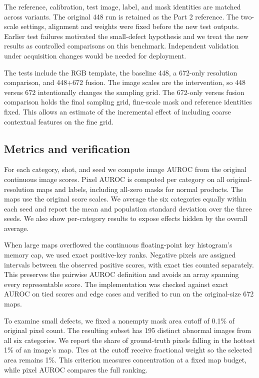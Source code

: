 \documentclass[10pt,twocolumn,letterpaper]{article}
\begin{document}
The reference, calibration, test image, label, and mask identities are matched across variants. The original 448 run is retained as the Part 2 reference. The two-scale settings, alignment and weights were fixed before the new test outputs. Earlier test failures motivated the small-defect hypothesis and we treat the new results as controlled comparisons on this benchmark. Independent validation under acquisition changes would be needed for deployment.

The tests include the RGB template, the baseline 448, a 672-only resolution comparison, and 448+672 fusion. The image scales are the intervention, so 448 versus 672 intentionally changes the sampling grid. The 672-only versus fusion comparison holds the final sampling grid, fine-scale mask and reference identities fixed. This allows an estimate of the incremental effect of including coarse contextual features on the fine grid.

\subsection{Metrics and verification}
For each category, shot, and seed we compute image AUROC from the original continuous image scores. Pixel AUROC is computed per category on all original-resolution maps and labels, including all-zero masks for normal products. The maps use the original score scales. We average the six categories equally within each seed and report the mean and population standard deviation over the three seeds. We also show per-category results to expose effects hidden by the overall average.

When large maps overflowed the continuous floating-point key histogram's memory cap, we used exact positive-key ranks. Negative pixels are assigned intervals between the observed positive scores, with exact ties counted separately. This preserves the pairwise AUROC definition and avoids an array spanning every representable score. The implementation was checked against exact AUROC on tied scores and edge cases and verified to run on the original-size 672 maps.

To examine small defects, we fixed a nonempty mask area cutoff of 0.1\% of original pixel count. The resulting subset has 195 distinct abnormal images from all six categories. We report the share of ground-truth pixels falling in the hottest 1\% of an image's map. Ties at the cutoff receive fractional weight so the selected area remains 1\%. This criterion measures concentration at a fixed map budget, while pixel AUROC compares the full ranking.
\end{document}
